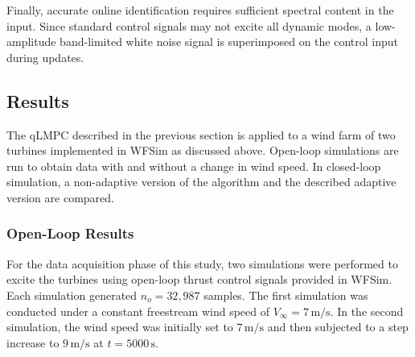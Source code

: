 Finally, accurate online identification requires sufficient spectral content in the input. Since standard control signals may not excite all dynamic modes, a low-amplitude band-limited white noise signal is superimposed on the control input during updates.


\subsection{Results} \label{section:AICWindFarmControl}
The qLMPC described in the previous section is applied to a wind farm of two turbines implemented in WFSim as discussed above. Open-loop simulations are run to obtain data with and without a change in wind speed. In closed-loop simulation, a non-adaptive version of the algorithm and the described adaptive version are compared.

\subsubsection{Open-Loop Results}

For the data acquisition phase of this study, two simulations were performed to excite the turbines using open-loop thrust control signals provided in WFSim. Each simulation generated $n_o = 32,987$ samples. The first simulation was conducted under a constant freestream wind speed of $V_\infty = 7\,\mathrm{m/s}$. In the second simulation, the wind speed was initially set to $7\,\mathrm{m/s}$ and then subjected to a step increase to $9\,\mathrm{m/s}$ at $t = 5000\,\mathrm{s}$.

